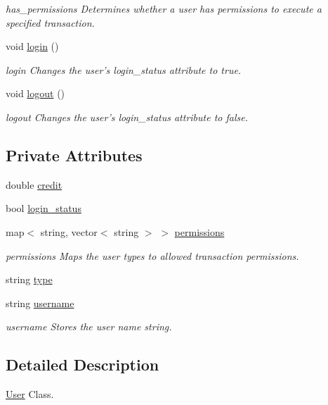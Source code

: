 \begin{DoxyCompactItemize}
\begin{DoxyCompactList}\small\item\em has\-\_\-permissions Determines whether a user has permissions to execute a specified transaction. \end{DoxyCompactList}\item 
void \hyperlink{class_user_af76b7b46958dabf5e4ee9a492f0ec3fa}{login} ()
\begin{DoxyCompactList}\small\item\em login Changes the user's login\-\_\-status attribute to true. \end{DoxyCompactList}\item 
void \hyperlink{class_user_a1af55df87e37292a150f183f1307ac43}{logout} ()
\begin{DoxyCompactList}\small\item\em logout Changes the user's login\-\_\-status attribute to false. \end{DoxyCompactList}\end{DoxyCompactItemize}
\subsection*{Private Attributes}
\begin{DoxyCompactItemize}
\item 
double \hyperlink{class_user_aa559c3686bb9d38c3335c16bbea07be8}{credit}
\item 
bool \hyperlink{class_user_a31c707cfc594c5ea9c710f9a8986401b}{login\-\_\-status}
\item 
map$<$ string, vector$<$ string $>$ $>$ \hyperlink{class_user_a57334f6c157620be2c10904a5025fc88}{permissions}
\begin{DoxyCompactList}\small\item\em permissions Maps the user types to allowed transaction permissions. \end{DoxyCompactList}\item 
string \hyperlink{class_user_acce15679d830831b0bbe8ebc2a60b2ca}{type}
\item 
string \hyperlink{class_user_aad02f271a6536fa078c6d1369ffdadc4}{username}
\begin{DoxyCompactList}\small\item\em username Stores the user name string. \end{DoxyCompactList}\end{DoxyCompactItemize}


\subsection{Detailed Description}
\hyperlink{class_user}{User} Class. 

